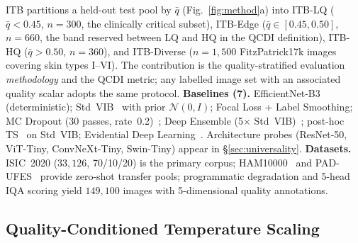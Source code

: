 \documentclass{bmvc2k}
\newcommand{\qbar}{\bar{q}}
\begin{document}
ITB partitions a held-out test pool by $\qbar$ (Fig.~\ref{fig:method}a) into ITB-LQ ($\qbar{<}0.45$, $n{=}300$, the clinically critical subset), ITB-Edge ($\qbar\in[0.45,0.50]$, $n{=}660$, the band reserved between LQ and HQ in the QCDI definition), ITB-HQ ($\qbar{>}0.50$, $n{=}360$), and ITB-Diverse ($n{=}1{,}500$ FitzPatrick17k images covering skin types I--VI). The contribution is the quality-stratified evaluation \emph{methodology} and the QCDI metric; any labelled image set with an associated quality scalar adopts the same protocol. \textbf{Baselines (7).} EfficientNet-B3 (deterministic); Std~VIB~\cite{alemi2017vib} with prior $\mathcal{N}(0,I)$; Focal Loss + Label Smoothing; MC Dropout (30 passes, rate~0.2)~\cite{gal2016dropout}; Deep Ensemble (5$\times$ Std~VIB)~\cite{lakshminarayanan2017ensemble}; post-hoc TS~\cite{guo2017calibration} on Std~VIB; Evidential Deep Learning~\cite{sensoy2018evidential}. Architecture probes (ResNet-50, ViT-Tiny, ConvNeXt-Tiny, Swin-Tiny) appear in \S\ref{sec:universality}. \textbf{Datasets.} ISIC~2020 ($33{,}126$, 70/10/20) is the primary corpus; HAM10000~\cite{tschandl2019ham10000} and PAD-UFES~\cite{pacheco2020pad} provide zero-shot transfer pools; programmatic degradation and 5-head IQA scoring yield $149{,}100$ images with 5-dimensional quality annotations.

\subsection{Quality-Conditioned Temperature Scaling}
\label{sec:qcts}
\end{document}

